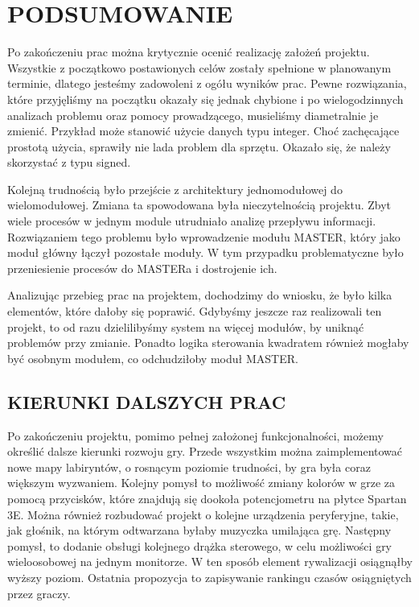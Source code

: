 \documentclass[11pt]{article}
\begin{document}
\section{PODSUMOWANIE}

\hspace*{0.55cm}Po zakończeniu prac można krytycznie ocenić realizację założeń projektu.
Wszystkie z początkowo postawionych celów zostały spełnione w planowanym terminie, dlatego jesteśmy zadowoleni z ogółu wyników prac.
Pewne rozwiązania, które przyjęliśmy na początku okazały się jednak chybione i po wielogodzinnych analizach problemu oraz pomocy prowadzącego, musieliśmy diametralnie je zmienić.
Przykład może stanowić użycie danych typu integer.
Choć zachęcające prostotą użycia, sprawiły nie lada problem dla sprzętu.
Okazało się, że należy skorzystać z typu signed.

Kolejną trudnością było przejście z architektury jednomodułowej do wielomodułowej.
Zmiana ta spowodowana była nieczytelnością projektu.
Zbyt wiele procesów w jednym module utrudniało analizę przepływu informacji.
Rozwiązaniem tego problemu było wprowadzenie modułu MASTER, który jako moduł główny łączył pozostałe moduły.
W tym przypadku problematyczne było przeniesienie procesów do MASTERa i dostrojenie ich.

Analizując przebieg prac na projektem, dochodzimy do wniosku, że było kilka elementów, które dałoby się poprawić.
Gdybyśmy jeszcze raz realizowali ten projekt, to od razu dzielilibyśmy system na więcej modułów, by uniknąć problemów przy zmianie.
Ponadto logika sterowania kwadratem również mogłaby być osobnym modułem, co odchudziłoby moduł MASTER.

\subsection{KIERUNKI DALSZYCH PRAC}

\hspace*{0.55cm}Po zakończeniu projektu, pomimo pełnej założonej funkcjonalności, możemy określić dalsze kierunki rozwoju gry.
Przede wszystkim można zaimplementować nowe mapy labiryntów, o rosnącym poziomie trudności, by gra była coraz większym wyzwaniem.
Kolejny pomysł to możliwość zmiany kolorów w grze za pomocą przycisków, które znajdują się dookoła potencjometru na płytce Spartan 3E.
Można również rozbudować projekt o kolejne urządzenia peryferyjne, takie, jak głośnik, na którym odtwarzana byłaby muzyczka umilająca grę.
Następny pomysł, to dodanie obsługi kolejnego drążka sterowego, w celu możliwości gry wieloosobowej na jednym monitorze.
W ten sposób element rywalizacji osiągnąłby wyższy poziom.
Ostatnia propozycja to zapisywanie rankingu czasów osiągniętych przez graczy.
\end{document}
